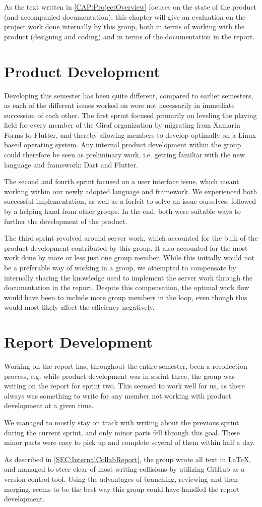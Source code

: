 As the text written in \autoref{CAP:ProjectOverview} focuses on the state of the product (and accompanied documentation), this chapter will give an evaluation on the project work done internally by this group, both in terms of working with the product (designing and coding) and in terms of the documentation in the report.

\section{Product Development}
Developing this semester has been quite different, compared to earlier semesters, as each of the different issues worked on were not necessarily in immediate succession of each other.
The first sprint focused primarily on leveling the playing field for every member of the Giraf organization by migrating from Xamarin Forms to Flutter, and thereby allowing members to develop optimally on a Linux based operating system.
Any internal product development within the group could therefore be seen as preliminary work, i.e. getting familiar with the new language and framework: Dart and Flutter.


The second and fourth sprint focused on a user interface issue, which meant working within our newly adopted language and framework.
We experienced both successful implementation, as well as a forfeit to solve an issue ourselves, followed by a helping hand from other groups.
In the end, both were suitable ways to further the development of the product.

The third sprint revolved around server work, which accounted for the bulk of the product development contributed by this group.
It also accounted for the most work done by more or less just one group member.
While this initially would not be a preferable way of working in a group, we attempted to compensate by internally sharing the knowledge used to implement the server work through the documentation in the report.
Despite this compensation, the optimal work flow would have been to include more group members in the loop, even though this would most likely affect the efficiency negatively.

\section{Report Development}
Working on the report has, throughout the entire semester, been a recollection process, e.g. while product development was in sprint three, the group was writing on the report for sprint two.
This seemed to work well for us, as there always was something to write for any member not working with product development at a given time.

We managed to mostly stay on track with writing about the previous sprint during the current sprint, and only minor parts fell through this goal.
These minor parts were easy to pick up and complete several of them within half a day.

As described in \autoref{SEC:InternalCollabReport}, the group wrote all text in \LaTeX, and managed to steer clear of most writing collisions by utilizing GitHub as a version control tool.
Using the advantages of branching, reviewing and then merging, seems to be the best way this group could have handled the report development.
